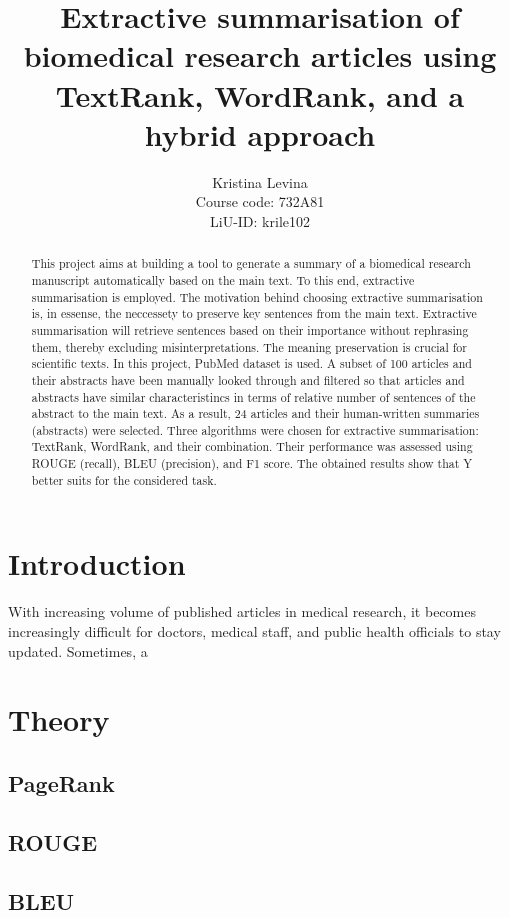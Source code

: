 \documentclass[11pt]{article}
\title{Extractive summarisation of biomedical research articles using TextRank, WordRank, and a hybrid approach}
\author{Kristina Levina \\
  Course code: 732A81 \\
  LiU-ID: krile102 \\}
\begin{document}
\maketitle
\begin{abstract}
This project aims at building a tool to generate a summary of a biomedical research manuscript automatically based on the main text. To this end, extractive summarisation is employed. The motivation behind choosing extractive summarisation is, in essense, the neccessety to preserve key sentences from the main text. Extractive summarisation will retrieve sentences based on their importance without rephrasing them, thereby excluding misinterpretations. The meaning preservation is crucial for scientific texts. In this project, PubMed dataset is used. A subset of 100 articles and their abstracts have been manually looked through and filtered so that articles and abstracts have similar characteristincs in terms of relative number of sentences of the abstract to the main text. As a result, 24 articles and their human-written summaries (abstracts) were selected. Three algorithms were chosen for extractive summarisation: TextRank, WordRank, and their combination. Their performance was assessed using ROUGE (recall), BLEU (precision), and F1 score. The obtained results show that Y better suits for the considered task. 

\end{abstract}

\section{Introduction}

With increasing volume of published articles in medical research, it becomes increasingly difficult for doctors, medical staff, and public health officials to stay updated. Sometimes, a

\section{Theory}
\subsection{PageRank}
\subsection{ROUGE}
\subsection{BLEU}
\end{document}
